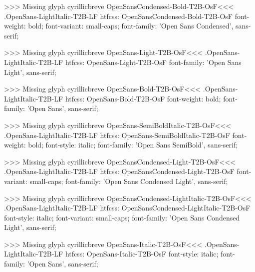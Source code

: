 >>>
Missing glyph	cyrillicbreve
\<OpenSansCondensed-Bold-T2B-OsF\><<<
.OpenSans-LightItalic-T2B-LF
htfcss:  OpenSansCondensed-Bold-T2B-OsF  font-weight: bold; font-variant: small-caps; font-family: 'Open Sans Condensed', sans-serif;

>>>
Missing glyph	cyrillicbreve
\<OpenSans-Light-T2B-OsF\><<<
.OpenSans-LightItalic-T2B-LF
htfcss:  OpenSans-Light-T2B-OsF  font-family: 'Open Sans Light', sans-serif;

>>>
Missing glyph	cyrillicbreve
\<OpenSans-Bold-T2B-OsF\><<<
.OpenSans-LightItalic-T2B-LF
htfcss:  OpenSans-Bold-T2B-OsF  font-weight: bold; font-family: 'Open Sans', sans-serif;

>>>
Missing glyph	cyrillicbreve
\<OpenSans-SemiBoldItalic-T2B-OsF\><<<
.OpenSans-LightItalic-T2B-LF
htfcss:  OpenSans-SemiBoldItalic-T2B-OsF  font-weight: bold; font-style: italic; font-family: 'Open Sans SemiBold', sans-serif;

>>>
Missing glyph	cyrillicbreve
\<OpenSansCondensed-Light-T2B-OsF\><<<
.OpenSans-LightItalic-T2B-LF
htfcss:  OpenSansCondensed-Light-T2B-OsF  font-variant: small-caps; font-family: 'Open Sans Condensed Light', sans-serif;

>>>
Missing glyph	cyrillicbreve
\<OpenSansCondensed-LightItalic-T2B-OsF\><<<
.OpenSans-LightItalic-T2B-LF
htfcss:  OpenSansCondensed-LightItalic-T2B-OsF  font-style: italic; font-variant: small-caps; font-family: 'Open Sans Condensed Light', sans-serif;

>>>
Missing glyph	cyrillicbreve
\<OpenSans-Italic-T2B-OsF\><<<
.OpenSans-LightItalic-T2B-LF
htfcss:  OpenSans-Italic-T2B-OsF  font-style: italic; font-family: 'Open Sans', sans-serif;

